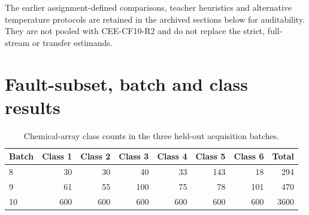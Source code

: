 \documentclass[10pt]{article}
\begin{document}
\begin{table}[ht]
\centering
\caption{Direct CPU timing for the primary Lite-CF endpoint chain. Each entry is the mean $\pm$ standard deviation of the per-seed median over 10 fitted endpoint pairs. Every median follows three warm-up and seven timed calls; loading is excluded. These workstation measurements are not embedded or real-time guarantees.}
\resizebox{0.92\textwidth}{!}{}
\end{table}

\begin{table}[ht]
\centering
\caption{Fixed-thread CPU sensitivity for the primary endpoint chain. Values are means $\pm$ standard deviations of the per-seed medians across 10 fitted pairs. Every median uses three warm-up and seven timed calls. The one-thread and 12-thread rows are separate controlled runs and are not combined.}
\label{tab:supp-thread-sensitivity}
\resizebox{0.86\textwidth}{!}{}
\end{table}

\begin{table}[ht]
\centering
\caption{Four-group deployment cost. State assumes 32-bit parameters. Complete-batch throughput and batch-size-one latency are reported separately; neither is a hardware-independent real-time guarantee.}
\label{tab:supp-cee-cost}
\resizebox{0.86\textwidth}{!}{}
\end{table}

\begin{table}[ht]
\centering
\caption{Counted linear-layer FLOPs and selector forward passes as the number of groups grows.}
\resizebox{0.62\textwidth}{!}{}
\end{table}

The earlier assignment-defined comparisons, teacher heuristics and alternative temperature protocols are retained in the archived sections below for auditability. They are not pooled with CEE-CF10-R2 and do not replace the strict, full-stream or transfer estimands.

\section{Fault-subset, batch and class results}

\begin{table}[ht]
\centering
\caption{Chemical-array class counts in the three held-out acquisition batches.}
\begin{tabular}{lrrrrrrr}
\toprule
Batch & Class 1 & Class 2 & Class 3 & Class 4 & Class 5 & Class 6 & Total\\
\midrule
8 & 30 & 30 & 40 & 33 & 143 & 18 & 294\\
9 & 61 & 55 & 100 & 75 & 78 & 101 & 470\\
10 & 600 & 600 & 600 & 600 & 600 & 600 & 3600\\
\bottomrule
\end{tabular}
\end{table}
\end{document}
